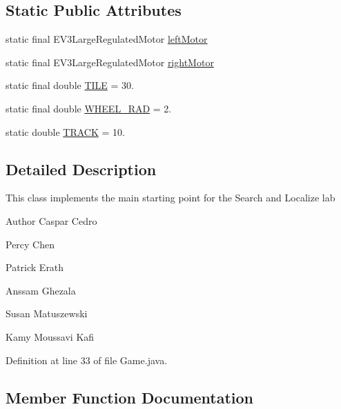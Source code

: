 \subsection*{Static Public Attributes}
\begin{DoxyCompactItemize}
\item 
static final E\+V3\+Large\+Regulated\+Motor \hyperlink{classca_1_1mcgill_1_1ecse211_1_1project_1_1_game_a40f6d5a8c70b88bf89b2171a02d2813f}{left\+Motor}
\item 
static final E\+V3\+Large\+Regulated\+Motor \hyperlink{classca_1_1mcgill_1_1ecse211_1_1project_1_1_game_a637614c1eb769dcdb09d897c66e453a2}{right\+Motor}
\item 
static final double \hyperlink{classca_1_1mcgill_1_1ecse211_1_1project_1_1_game_a9a7a353789ddffcb938827410318b4fe}{T\+I\+LE} = 30.
\item 
static final double \hyperlink{classca_1_1mcgill_1_1ecse211_1_1project_1_1_game_a206492a827a716e6c606dc817cb4ff4d}{W\+H\+E\+E\+L\+\_\+\+R\+AD} = 2.
\item 
static double \hyperlink{classca_1_1mcgill_1_1ecse211_1_1project_1_1_game_ad7896596e6ee5d9ff87a7bdbf230995c}{T\+R\+A\+CK} = 10.
\end{DoxyCompactItemize}


\subsection{Detailed Description}
This class implements the main starting point for the Search and Localize lab

\begin{DoxyAuthor}{Author}
Caspar Cedro 

Percy Chen 

Patrick Erath 

Anssam Ghezala 

Susan Matuszewski 

Kamy Moussavi Kafi 
\end{DoxyAuthor}


Definition at line 33 of file Game.\+java.



\subsection{Member Function Documentation}
\mbox{\label{classca_1_1mcgill_1_1ecse211_1_1project_1_1_game_ad1a9b39b2449607da3320b28c72ba379}} 

